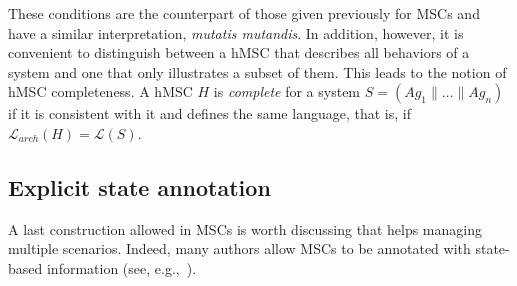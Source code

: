 These conditions are the counterpart of those given previously for MSCs and have a similar interpretation, \emph{mutatis mutandis}. In addition, however, it is convenient to distinguish between a hMSC that describes all behaviors of a system and one that only illustrates a subset of them. This leads to the notion of hMSC completeness. A hMSC $H$ is \emph{complete} for a system $S = (Ag_1 \parallel \ldots \parallel Ag_n)$ if it is consistent with it and defines the same language, that is, if $\mathcal{L}_{arch}(H) = \mathcal{L}(S).$

\subsection{Explicit state annotation}

A last construction allowed in MSCs is worth discussing that helps managing multiple scenarios. Indeed, many authors allow MSCs to be annotated with state-based information (see, e.g.,~\cite{Kruger:2000, Whittle:2000}). 
